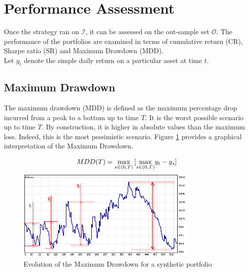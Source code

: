 \documentclass[11pt,a4,twosided,singlespacing,titlepagenumber=on]{scrreprt}
\numberwithin{equation}{chapter} %
\theoremstyle{remark}
\begin{document}
\section{Performance Assessment}
Once the strategy ran on $\mathcal{I}$, it can be assessed on the out-sample set $\mathcal{O}$. The performance of the portfolios are examined in terms of cumulative return (CR), Sharpe ratio (SR) and Maximum Drawdown (MDD). \\

Let $y_t$ denote the simple daily return on a particular asset at time $t$. 

\subsection{Maximum Drawdown}
The maximum drawdown (MDD) is defined as the maximum percentage drop incurred from a peak to a bottom up to time $T$. It is the worst possible scenario up to time $T$. By construction, it is higher in absolute values than the maximum loss. Indeed, this is the most pessimistic scenario. Figure \ref{mdd} provides a graphical interpretation of the Maximum Drawdown.

\begin{equation}
MDD(T) = \smash{\displaystyle\max_{s \in (0,T)}} \left[\smash{\displaystyle\max_{s \in (0,T)}} y_t - y_s \right] 
\end{equation}

\begin{figure}[H]
\centering
\includegraphics[width = 0.8\textwidth]{mdd}
\caption{Evolution of the Maximum Drawdown for a synthetic portfolio}
\label{mdd}
\end{figure}
\end{document}
